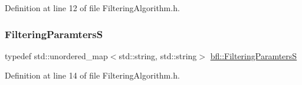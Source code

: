 Definition at line 12 of file Filtering\+Algorithm.\+h.

\mbox{\label{namespacebfl_aaa1677d9f16c84aac08a5a0bf36a0fa6}} 
\subsubsection{\texorpdfstring{Filtering\+ParamtersS}{FilteringParamtersS}}
{\footnotesize\ttfamily typedef std\+::unordered\+\_\+map$<$std\+::string, std\+::string$>$ \mbox{\hyperlink{namespacebfl_aaa1677d9f16c84aac08a5a0bf36a0fa6}{bfl\+::\+Filtering\+ParamtersS}}}



Definition at line 14 of file Filtering\+Algorithm.\+h.

